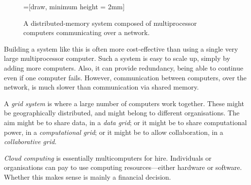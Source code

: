 \begin{figure}
\begin{center}
=[draw, minimum height = 2mm]
\end{center}
\caption{A distributed-memory system composed of multiprocessor computers
  communicating over a network.}
\label{fig:distributed}
\end{figure}


Building a system like this is often more cost-effective than using a single
very large multiprocessor computer.  Such a system is easy to scale up, simply
by adding more computers.  Also, it can provide redundancy, being able to
continue even if one computer fails.  However, communication between
computers, over the network, is much slower than communication via shared
memory.

A \emph{grid system} is where a large number of computers
work together.  These might be geographically distributed, and might belong to
different organisations.  The aim might be to share data, in a \emph{data
grid}; or it might be to share computational power, in a \emph{computational
grid}; or it might be to allow collaboration, in a \emph{collaborative grid}.

\emph{Cloud computing} is essentially multicomputers
for hire.  Individuals or organisations can pay to use computing
resources---either hardware or software.  Whether this makes sense is mainly a
financial decision.


